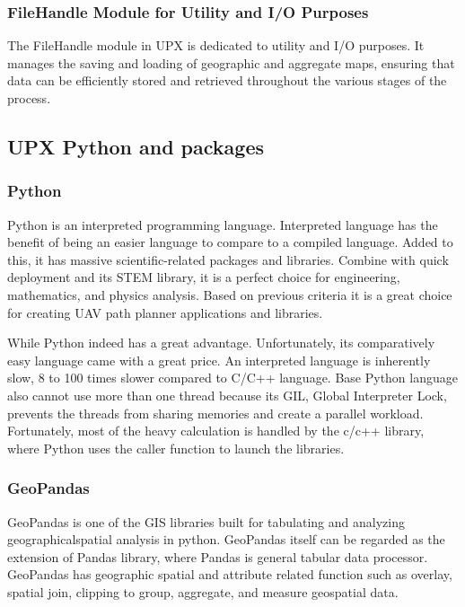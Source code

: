 \documentclass[12pt]{report}
\begin{document}
        \subsubsection{FileHandle Module for Utility and I/O Purposes}
        The FileHandle module in UPX is dedicated to utility and I/O purposes. It manages the saving and loading of
        geographic and aggregate maps, ensuring that data can be efficiently stored and retrieved throughout the various
        stages of the process.

        \subsection{UPX Python and packages}
        \subsubsection{Python}
        Python is an interpreted programming language. Interpreted language has the benefit of being an easier language
        to compare to a compiled language. Added to this, it has massive scientific-related packages and libraries.
        Combine with quick deployment and its STEM library, it is a perfect choice for engineering, mathematics, and
        physics analysis. Based on previous criteria it is a great choice for creating UAV path planner applications and
        libraries.

        While Python indeed has a great advantage. Unfortunately, its comparatively easy language came with a great
        price. An interpreted language is inherently slow, 8 to 100 times slower compared to C/C++ language. Base Python
        language also cannot use more than one thread because its GIL, Global Interpreter Lock, prevents the threads
        from sharing memories and create a parallel workload. Fortunately, most of the heavy calculation is handled by
        the c/c++ library, where Python uses the caller function to launch the libraries.

        \subsubsection{GeoPandas}
        GeoPandas is one of the GIS libraries built for tabulating and analyzing geographicalspatial analysis in python.
        GeoPandas itself can be regarded as the extension of Pandas library, where Pandas is general tabular data
        processor. GeoPandas has geographic spatial and attribute related function such as overlay, spatial join,
        clipping to group, aggregate, and measure geospatial data.
\end{document}
